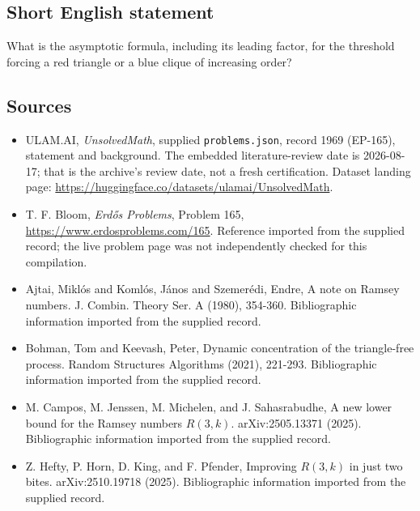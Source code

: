 \documentclass[11pt,a4paper]{article}
\begin{document}
\subsection{Short English statement}

What is the asymptotic formula, including its leading factor, for the threshold forcing a red triangle or a blue clique of increasing order?

\subsection{Sources}

{\small

\begin{itemize}

\item[\hypertarget{source:1969:1}{S1}] ULAM.AI, \emph{UnsolvedMath}, supplied \texttt{problems.json}, record 1969 (EP-165), statement and background. The embedded literature-review date is 2026-08-17; that is the archive’s review date, not a fresh certification. Dataset landing page: \url{https://huggingface.co/datasets/ulamai/UnsolvedMath}.

\item[\hypertarget{source:1969:2}{S2}] T. F. Bloom, \emph{Erdős Problems}, Problem 165, \url{https://www.erdosproblems.com/165}. Reference imported from the supplied record; the live problem page was not independently checked for this compilation.

\item[\hypertarget{source:1969:3}{S3}] Ajtai, Mikl\'{o}s and Koml\'{o}s, J\'{a}nos and Szemer\'{e}di, Endre, A note on Ramsey numbers. J. Combin. Theory Ser. A (1980), 354-360. Bibliographic information imported from the supplied record.

\item[\hypertarget{source:1969:4}{S4}] Bohman, Tom and Keevash, Peter, Dynamic concentration of the triangle-free process. Random Structures Algorithms (2021), 221-293. Bibliographic information imported from the supplied record.

\item[\hypertarget{source:1969:5}{S5}] M. Campos, M. Jenssen, M. Michelen, and J. Sahasrabudhe, A new lower bound for the Ramsey numbers $R(3,k)$. arXiv:2505.13371 (2025). Bibliographic information imported from the supplied record.

\item[\hypertarget{source:1969:6}{S6}] Z. Hefty, P. Horn, D. King, and F. Pfender, Improving $R(3,k)$ in just two bites. arXiv:2510.19718 (2025). Bibliographic information imported from the supplied record.

\end{itemize}

}

\label{end:1969}
\end{document}
